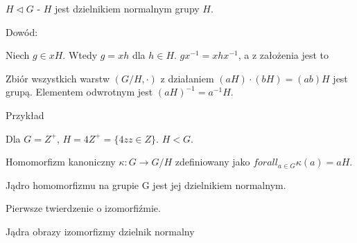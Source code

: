 \documentclass{report}
\begin{document}
$ H \triangleleft G $ - $H$ jest dzielnikiem normalnym grupy $H$.

Dowód:

Niech $g \in xH$. Wtedy $g = xh$ dla $h \in H$. $gx^{-1} = xhx^{-1}$, a z założenia jest to

Zbiór wszystkich warstw $(G/H, \cdot)$ z działaniem $(aH)\cdot(bH) = (ab)H$ jest grupą. Elementem odwrotnym jest $(aH)^{-1} = a^{-1}H$.

Przykład

Dla $G = Z^+$, $H = 4Z^+ = \{ 4z z \in Z\}$. $H < G$.

Homomorfizm kanoniczny $\kappa : G \to G/H$ zdefiniowany jako $forall_{a\in G} \kappa(a) = aH$.

Jądro homomorfizmu na grupie G jest jej dzielnikiem normalnym.

Pierwsze twierdzenie o izomorfiźmie.

Jądra obrazy izomorfizmy dzielnik normalny
\end{document}
